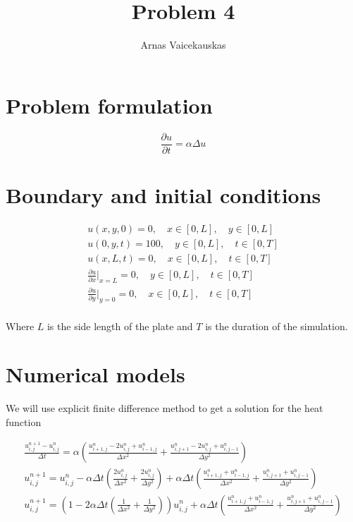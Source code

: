\documentclass{article}
\title{Problem 4}
\author{Arnas Vaicekauskas}
\begin{document}
\maketitle

\section{Problem formulation}

$$
\frac{\partial u}{\partial t}=\alpha\Delta u
$$

\section{Boundary and initial conditions}

\begin{equation}
    \begin{aligned}
        u(x, y, 0) = 0,\quad x\in[0,L],\quad y\in[0,L]\\
        u(0, y, t) = 100,\quad y\in[0,L],\quad t\in[0,T] \\
        u(x, L, t) = 0,\quad x\in[0,L],\quad t\in[0,T]\\
        \frac{\partial u}{\partial x}\Big|_{x=L}=0,\quad y\in[0,L],\quad t\in[0,T]\\
        \frac{\partial u}{\partial y}\Big|_{y=0}=0,\quad x\in[0,L],\quad t\in[0,T]\\
    \end{aligned}
\end{equation}

Where $L$ is the side length of the plate and $T$ is the duration of the simulation.

\section{Numerical models}

We will use explicit finite difference method to get a solution for the heat function

\begin{equation}
    \begin{aligned}
        \frac{u^{n+1}_{i,j}-u^{n}_{i,j}}{\Delta t}=\alpha\left(\frac{u^n_{i+1,j}-2u^n_{i,j}+u^n_{i-1,j}}{\Delta x^2}+\frac{u^n_{i,j+1}-2u^n_{i,j}+u^n_{i,j-1}}{\Delta y^2}\right)\\
        u^{n+1}_{i,j}=u^{n}_{i,j}-\alpha\Delta t\left(\frac{2u^n_{i,j}}{\Delta x^2}+\frac{2u^n_{i,j}}{\Delta y^2}\right)+\alpha\Delta t\left(\frac{u^n_{i+1,j}+u^n_{i-1,j}}{\Delta x^2}+\frac{u^n_{i,j+1}+u^n_{i,j-1}}{\Delta y^2}\right)\\
        u^{n+1}_{i,j}=\left(1-2\alpha\Delta t\left(\frac{1}{\Delta x^2}+\frac{1}{\Delta y^2}\right)\right)u^{n}_{i,j}+\alpha\Delta t\left(\frac{u^n_{i+1,j}+u^n_{i-1,j}}{\Delta x^2}+\frac{u^n_{i,j+1}+u^n_{i,j-1}}{\Delta y^2}\right)
    \end{aligned}
\end{equation}
\end{document}
